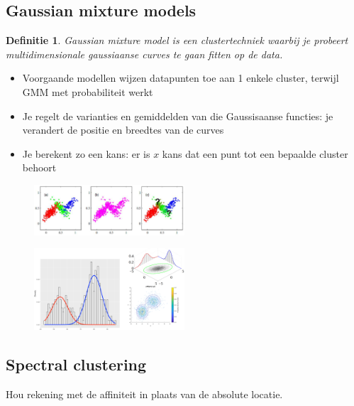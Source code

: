 \documentclass{article}
\newtheorem{theorem}{Definitie}[section]
\begin{document}
\subsection{Gaussian mixture models}

\begin{theorem}
    Gaussian mixture model is een clustertechniek waarbij je probeert multidimensionale 
    gaussiaanse curves te gaan fitten op de data. 
\end{theorem}


\begin{itemize}
    \item Voorgaande modellen wijzen datapunten toe aan 1 enkele cluster, terwijl GMM met probabiliteit werkt
    \item Je regelt de varianties en gemiddelden van die Gaussisaanse functies: je verandert de positie en breedtes van de curves
    \item Je berekent zo een kans: er is $x$ kans dat een punt tot een bepaalde cluster behoort 
\end{itemize}

\begin{figure}[H]
    \centering
    \includegraphics[width=0.5\textwidth]{gaussian-mixture-models.png}
\end{figure}

\begin{figure}[H]
    \centering
    \includegraphics[width=0.5\textwidth]{gaussian-mixture-models2.png}
\end{figure}

\subsection{Spectral clustering}

Hou rekening met de affiniteit in plaats van de absolute locatie.
\end{document}
